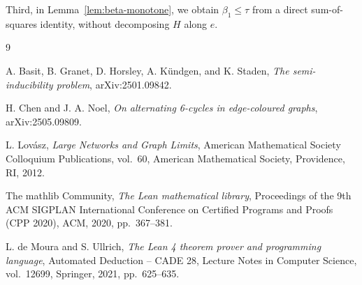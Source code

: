 \documentclass[11pt]{article}
\begin{document}
Third, in Lemma~\ref{lem:beta-monotone}, we obtain $\beta_1\le\tau$
from a direct sum-of-squares identity, without decomposing $H$ along
$e$.

\begin{thebibliography}{9}

A. Basit, B. Granet, D. Horsley, A. K\"undgen, and K. Staden,
\emph{The semi-inducibility problem},
arXiv:2501.09842.

H. Chen and J. A. Noel,
\emph{On alternating 6-cycles in edge-coloured graphs},
arXiv:2505.09809.

L. Lov\'asz,
\emph{Large Networks and Graph Limits},
American Mathematical Society Colloquium Publications, vol.~60,
American Mathematical Society, Providence, RI, 2012.

The mathlib Community,
\emph{The Lean mathematical library},
Proceedings of the 9th ACM SIGPLAN International Conference on
Certified Programs and Proofs (CPP 2020), ACM, 2020, pp.~367--381.

L. de Moura and S. Ullrich,
\emph{The Lean 4 theorem prover and programming language},
Automated Deduction -- CADE 28, Lecture Notes in Computer Science,
vol.~12699, Springer, 2021, pp.~625--635.

\end{thebibliography}
\end{document}
